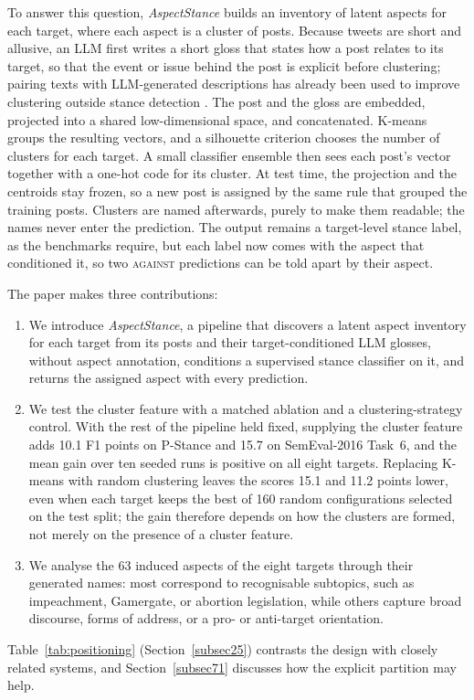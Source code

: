 \documentclass[pdflatex,sn-mathphys-num,iicol]{sn-jnl}%
\begin{document}
To answer this question, \textit{AspectStance} builds an inventory of latent aspects for each target, where each aspect is a cluster of posts. Because tweets are short and allusive, an LLM first writes a short gloss that states how a post relates to its target, so that the event or issue behind the post is explicit before clustering; pairing texts with LLM-generated descriptions has already been used to improve clustering outside stance detection \cite{viswanathan2024fewshot,deraedt2023idas}. The post and the gloss are embedded, projected into a shared low-dimensional space, and concatenated. K-means groups the resulting vectors, and a silhouette criterion chooses the number of clusters for each target. A small classifier ensemble then sees each post's vector together with a one-hot code for its cluster. At test time, the projection and the centroids stay frozen, so a new post is assigned by the same rule that grouped the training posts. Clusters are named afterwards, purely to make them readable; the names never enter the prediction. The output remains a target-level stance label, as the benchmarks require, but each label now comes with the aspect that conditioned it, so two \textsc{against} predictions can be told apart by their aspect.

The paper makes three contributions:
\begin{enumerate}
	\item We introduce \textit{AspectStance}, a pipeline that discovers a latent aspect inventory for each target from its posts and their target-conditioned LLM glosses, without aspect annotation, conditions a supervised stance classifier on it, and returns the assigned aspect with every prediction.
	\item We test the cluster feature with a matched ablation and a clustering-strategy control. With the rest of the pipeline held fixed, supplying the cluster feature adds 10.1 F1 points on P-Stance and 15.7 on SemEval-2016 Task~6, and the mean gain over ten seeded runs is positive on all eight targets. Replacing K-means with random clustering leaves the scores 15.1 and 11.2 points lower, even when each target keeps the best of 160 random configurations selected on the test split; the gain therefore depends on how the clusters are formed, not merely on the presence of a cluster feature.
	\item We analyse the 63 induced aspects of the eight targets through their generated names: most correspond to recognisable subtopics, such as impeachment, Gamergate, or abortion legislation, while others capture broad discourse, forms of address, or a pro- or anti-target orientation.
\end{enumerate}
Table~\ref{tab:positioning} (Section~\ref{subsec25}) contrasts the design with closely related systems, and Section~\ref{subsec71} discusses how the explicit partition may help.
\end{document}
